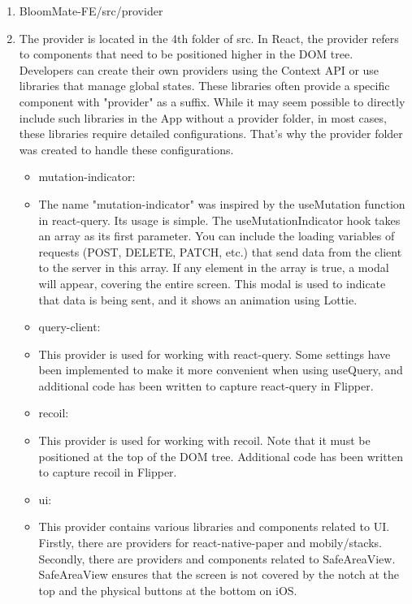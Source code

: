 \documentclass[conference, a4paper]{IEEEtran}
\begin{document}
\begin{enumerate}
\begin{enumerate}
    \item BloomMate-FE/src/provider
    \item[] The provider is located in the 4th folder of src. In React, the provider refers to components that need to be positioned higher in the DOM tree. Developers can create their own providers using the Context API or use libraries that manage global states. These libraries often provide a specific component with "provider" as a suffix. While it may seem possible to directly include such libraries in the App without a provider folder, in most cases, these libraries require detailed configurations. That's why the provider folder was created to handle these configurations.
    \begin{itemize}
        \item mutation-indicator: 
        \item[] The name "mutation-indicator" was inspired by the useMutation function in react-query. Its usage is simple. The useMutationIndicator hook takes an array as its first parameter. You can include the loading variables of requests (POST, DELETE, PATCH, etc.) that send data from the client to the server in this array. If any element in the array is true, a modal will appear, covering the entire screen. This modal is used to indicate that data is being sent, and it shows an animation using Lottie.\\

        \item query-client: 
        \item[] This provider is used for working with react-query. Some settings have been implemented to make it more convenient when using useQuery, and additional code has been written to capture react-query in Flipper. \\

        \item recoil: 
        \item[] This provider is used for working with recoil. Note that it must be positioned at the top of the DOM tree. Additional code has been written to capture recoil in Flipper. \\

        \item ui: 
        \item[] This provider contains various libraries and components related to UI. Firstly, there are providers for react-native-paper and mobily/stacks. Secondly, there are providers and components related to SafeAreaView. SafeAreaView ensures that the screen is not covered by the notch at the top and the physical buttons at the bottom on iOS.
    \end{itemize}


\end{enumerate}
\end{enumerate}
\end{document}
